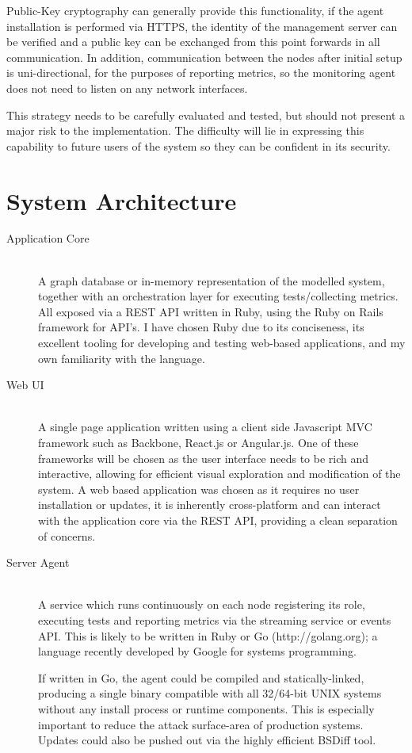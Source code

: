 \documentclass{cshonours}
\begin{document}
Public-Key cryptography can generally provide this functionality, if the agent installation is performed via HTTPS, the identity of the management server can be verified and a public key can be exchanged from this point forwards in all communication. In addition, communication between the nodes after initial setup is uni-directional, for the purposes of reporting metrics, so the monitoring agent does not need to listen on any network interfaces.

This strategy needs to be carefully evaluated and tested, but should not present a major risk to the implementation. The difficulty will lie in expressing this capability to future users of the system so they can be confident in its security.

\pagebreak
\section{System Architecture}
\label{section:architecture}

\begin{description}
  \item [Application Core]\hfill \\
    A graph database or in-memory representation of the modelled system, together with an orchestration layer for executing tests/collecting metrics. All exposed via a REST API written in Ruby, using the Ruby on Rails framework for API's. I have chosen Ruby due to its conciseness, its excellent tooling for developing and testing web-based applications, and my own familiarity with the language.
  \item [Web UI]\hfill \\
    A single page application written using a client side Javascript MVC framework such as Backbone, React.js or Angular.js. One of these frameworks will be chosen as the user interface needs to be rich and interactive, allowing for efficient visual exploration and modification of the system. A web based application was chosen as it requires no user installation or updates, it is inherently cross-platform and can interact with the application core via the REST API, providing a clean separation of concerns.
  \item [Server Agent]\hfill \\
    A service which runs continuously on each node registering its role, executing tests and reporting metrics via the streaming service or events API\@. This is likely to be written in Ruby or Go (http://golang.org); a language recently developed by Google for systems programming.

    If written in Go, the agent could be compiled and statically-linked, producing a single binary compatible with all 32/64-bit UNIX systems without any install process or runtime components. This is especially important to reduce the attack surface-area of production systems. Updates could also be pushed out via the highly efficient BSDiff tool.
\end{description}
\end{document}

